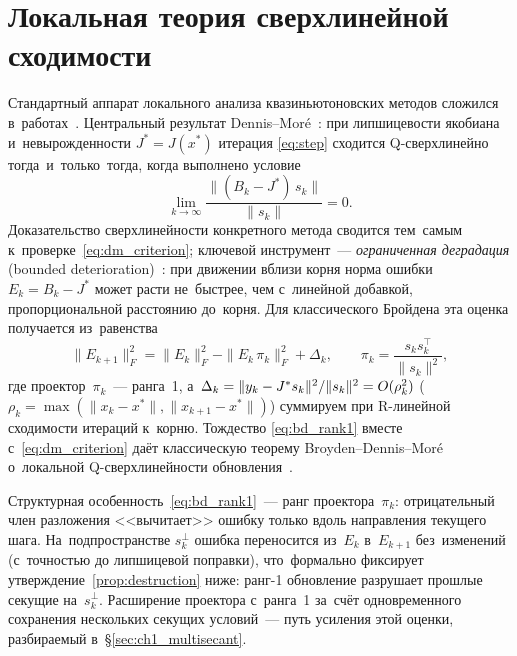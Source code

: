 \section{Локальная теория сверхлинейной сходимости}\label{sec:ch1_local}

Стандартный аппарат локального анализа квазиньютоновских методов
сложился в~работах~\cite{broyden1973,dennis1974,dennis1977,dennis1996}.
Центральный результат Dennis--Mor\'e~\cite{dennis1974}: при
липшицевости якобиана и~невырожденности $J^* = J(x^*)$ итерация
\eqref{eq:step} сходится Q-сверхлинейно тогда~и~только~тогда, когда
выполнено условие
\begin{equation}\label{eq:dm_criterion}
  \lim_{k\to\infty}\frac{\|(B_k - J^*)\,s_k\|}{\|s_k\|} = 0.
\end{equation}
Доказательство сверхлинейности конкретного метода сводится тем~самым
к~проверке~\eqref{eq:dm_criterion}; ключевой инструмент~---
\emph{ограниченная деградация} (bounded
deterioration)~\cite{broyden1973,dennis1996}: при движении вблизи
корня норма ошибки $E_k = B_k - J^*$ может расти не~быстрее, чем
с~линейной добавкой, пропорциональной расстоянию до~корня. Для
классического Бройдена эта оценка получается из~равенства
\begin{equation}\label{eq:bd_rank1}
  \|E_{k+1}\|_F^2 = \|E_k\|_F^2 - \|E_k\,\pi_k\|_F^2 + \Delta_k,
  \qquad \pi_k = \frac{s_k s_k^\top}{\|s_k\|^2},
\end{equation}
где проектор~$\pi_k$~--- ранга~1, а~$\Delta_k = \|y_k-J^{*} s_k\|^2/\|s_k\|^2 = O(\rho_k^2)$
($\rho_k = \max(\|x_k-x^*\|,\|x_{k+1}-x^*\|)$) суммируем при R-линейной
сходимости итераций к~корню. Тождество
\eqref{eq:bd_rank1} вместе с~\eqref{eq:dm_criterion} даёт классическую
теорему Broyden--Dennis--Mor\'e о~локальной Q-сверхлинейности
обновления~\cite{broyden1973}.

Структурная особенность~\eqref{eq:bd_rank1}~--- ранг проектора~$\pi_k$:
отрицательный член разложения <<вычитает>> ошибку только вдоль
направления текущего шага. На~подпространстве $s_k^\perp$ ошибка
переносится из~$E_k$ в~$E_{k+1}$ без~изменений (с~точностью до
липшицевой поправки), что~формально фиксирует
утверждение~\ref{prop:destruction} ниже: ранг-1 обновление разрушает
прошлые секущие на~$s_k^\perp$. Расширение проектора с~ранга~1
за~счёт одновременного сохранения нескольких секущих условий~---
путь усиления этой оценки, разбираемый в~\S\ref{sec:ch1_multisecant}.

